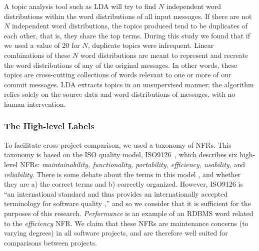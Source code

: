 \documentclass[smallextended]{svjour3}       %
\begin{document}
A topic analysis tool such as LDA will try to find $N$ independent
word distributions within the word distributions of all input
messages. 
If there are not $N$ independent word distributions, the topics
produced tend to be duplicates of each other, that is, they share the
top terms. During this study we found that if we used a value of 20 for $N$, duplicate topics were infrequent.
Linear combinations of these $N$ word distributions are meant to represent and recreate the word distributions of any of the original messages. In other words, these topics are cross-cutting collections of words relevant to one or more of our commit messages. 
LDA extracts topics in an unsupervised manner; the algorithm relies
solely on the source data and word distributions of messages, with no human intervention.




\subsubsection{The High-level Labels}


To facilitate cross-project comparison, we used a taxonomy of NFRs. This taxonomy is based on the ISO quality model, ISO9126~\cite{iso9126}, which describes six high-level NFRs: \emph{maintainability, functionality,
portability, efficiency, usability,} and \emph{reliability}. 
There is some debate about the terms in this model \cite{Boegh2008}, and whether they are a) the correct terms and b) correctly organized. 
However, ISO9126 is ``an international standard and thus provides an 
internationally accepted terminology for software quality
\cite[p. 58]{Boegh2008},'' and so we consider that it is sufficient for the purposes of this
research.  
\emph{Performance} is an example of an RDBMS word related to the \emph{efficiency} NFR.
We claim that these NFRs are maintenance concerns (to varying degrees) in all software projects, and are therefore well suited for comparisons between
projects.
\end{document}
